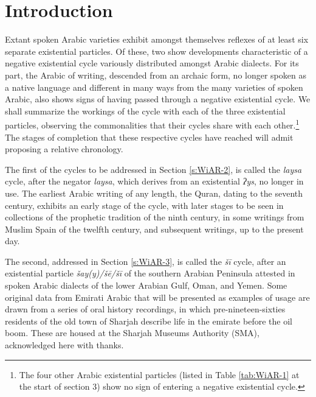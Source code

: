 \documentclass[output=paper]{langsci/langscibook}
\author{David Wilmsen\affiliation{American University of Sharjah}}
\begin{document}
\maketitle

\section{Introduction} \label{s:WiAR-1}

Extant spoken Arabic varieties exhibit amongst themselves reflexes of at least six separate existential particles. Of these, two show developments characteristic of a negative existential cycle \citep{Croft1991} variously distributed amongst Arabic dialects. For its part, the Arabic of writing, descended from an archaic form, no longer spoken as a native language and different in many ways from the many varieties of spoken Arabic, also shows signs of having passed through a negative existential cycle. We shall summarize the workings of the cycle with each of the three existential particles, observing the commonalities that their cycles share with each other.\footnote{The four other Arabic existential particles (listed in Table \ref{tab:WiAR-1} at the start of section 3) show no sign of entering a negative existential cycle.} The stages of completion that these respective cycles have reached will admit proposing a relative chronology.

The first of the cycles to be addressed in Section \ref{s:WiAR-2}, is called the \textit{laysa} cycle, after the negator \textit{laysa}, which derives from an existential \textit{ʔys}, no longer in use. The earliest Arabic writing of any length, the Quran, dating to the seventh century, exhibits an early stage of the cycle, with later stages to be seen in collections of the prophetic tradition of the ninth century, in some writings from Muslim Spain of the twelfth century, and subsequent writings, up to the present day.

The second, addressed in Section \ref{s:WiAR-3}, is called the \textit{šī} cycle, after an existential particle \textit{šay(y)/šē/šī} of the southern Arabian Peninsula attested in spoken Arabic dialects of the lower Arabian Gulf, Oman, and Yemen. Some original data from Emirati Arabic that will be presented as examples of usage are drawn from a series of oral history recordings, in which pre-nineteen-sixties residents of the old town of Sharjah describe life in the emirate before the oil boom. These are housed at the Sharjah Museums Authority (SMA), acknowledged here with thanks.
\end{document}
